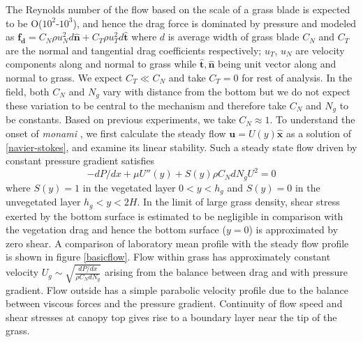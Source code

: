 \documentclass[aps,prl,twocolumn,superscriptaddress,10pt]{revtex4-1}  %
\newcommand{\bn}{{\boldsymbol{\hat{n}}}}
\newcommand{\bt}{{\boldsymbol{\hat{t}}}}
\newcommand{\bu}{\mathbf{u}}
\newcommand{\hg}{h_g}
\newcommand{\monami}{\textit{monami }}
\newcommand{\shreyas}[1]{}
\begin{document}
The Reynolds number of the flow based on the scale of a grass blade is expected to be O($10^2$-$10^3$), and hence the drag force is dominated by pressure and modeled as 
$\mathbf{f_{d}}=C_N \rho u_{N}^{2}d\bn + C_{T}\rho u_{T}^{2}d\bt$ \shreyas{citation needed} 
where $d$ is average width of grass blade $C_{N}$ and $C_{T}$ are the normal and tangential drag coefficients respectively; $u_{T}$, $u_{N}$ are velocity components along and
normal to grass while $\bt,\bn$ being unit vector along and normal to grass. 
We expect $C_T \ll C_N$ and take $C_T=0$ for rest of analysis. 
In the field, both $C_N$ and $N_g$ vary with distance from the bottom but we do not expect these variation to be central to the mechanism and therefore take $C_N$ and $N_g$ to be constants. 
Based on previous experiments\cite{Vivoni98}, we take $C_N \approx 1$.
\newline
To understand the onset of \monami, we first calculate the steady flow $\bu = U(y)\boldsymbol{\hat{x}}$ as a solution of \eqref{navier-stokes}, and examine its linear stability. 
Such a steady state flow driven by constant pressure gradient satisfies 
\begin{equation}
 -{dP}/{dx}+\mu U''(y) +S(y) \rho C_N d N_gU^2=0
\label{base_equ}
\end{equation}
where $S(y)=1$ in the vegetated layer $0<y<\hg$ and $S(y)=0$ in the unvegetated layer $\hg< y< 2H$. 
In the limit of large grass density, shear stress exerted by the bottom surface is estimated to be negligible in comparison with the vegetation drag and hence the bottom surface ($y=0$) is approximated by zero shear.   
A comparison of laboratory mean profile with the steady flow profile is shown in figure \eqref{basicflow}.
Flow within grass has approximately constant velocity $U_g \sim \sqrt{\frac{dP/dx}{\rho C_N dN_g}}$ arising from the balance between drag and with pressure gradient. 
Flow outside has a simple parabolic velocity profile due to the balance between viscous forces and the pressure gradient. 
Continuity of flow speed and shear stresses at canopy top gives rise to a boundary layer near the tip of the grass.
\end{document}
